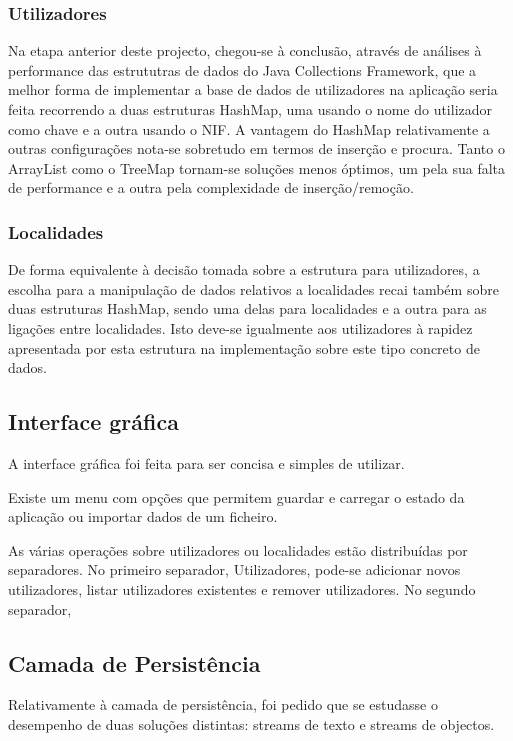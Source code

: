 \documentclass[a5paper,twocolumn, 11pt]{article}
\begin{document}
\subsubsection{Utilizadores}
Na etapa anterior deste projecto, chegou-se à conclusão, através de análises à performance das estrututras de dados do Java Collections Framework, que a melhor forma de implementar a base de dados de utilizadores na aplicação seria feita recorrendo a duas estruturas HashMap, uma usando o nome do utilizador como chave e a outra usando o NIF. A vantagem do HashMap relativamente a outras configurações nota-se sobretudo em termos de inserção e procura. Tanto o ArrayList como o TreeMap tornam-se soluções menos óptimos, um pela sua falta de performance e a outra pela complexidade de inserção/remoção.

\subsubsection{Localidades}
De forma equivalente à decisão tomada sobre a estrutura para utilizadores, a escolha para a manipulação de dados relativos a localidades recai também sobre duas estruturas HashMap, sendo uma delas para localidades e a outra para as ligações entre localidades. Isto deve-se igualmente aos utilizadores à rapidez apresentada por esta estrutura na implementação sobre este tipo concreto de dados.
\clearpage
\newpage

\subsection{Interface gráfica}
A interface gráfica foi feita para ser concisa e simples de utilizar.

Existe um menu com opções que permitem guardar e carregar o estado da aplicação ou importar dados de um ficheiro.

As várias operações sobre utilizadores ou localidades estão distribuídas por separadores. No primeiro separador, Utilizadores, pode-se adicionar novos utilizadores, listar utilizadores existentes e remover utilizadores. No segundo separador, 
\clearpage
\newpage

\subsection{Camada de Persistência}
Relativamente à camada de persistência, foi pedido que se estudasse o desempenho de duas soluções distintas: streams de texto e streams de objectos.
\end{document}
